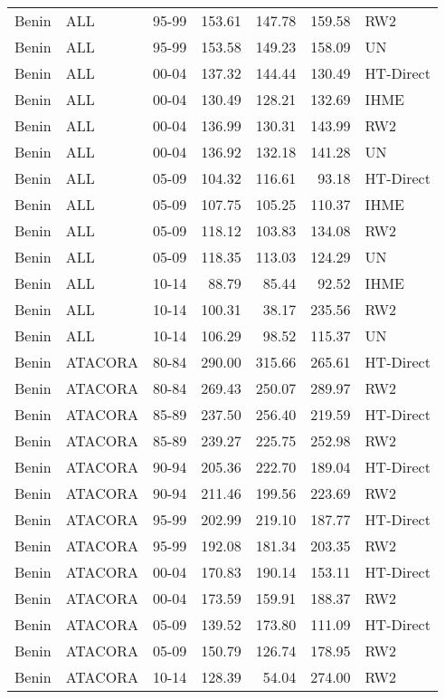 \begin{longtable}{lllrrrl}
  Benin & ALL & 95-99 & 153.61 & 147.78 & 159.58 & RW2 \\ 
  Benin & ALL & 95-99 & 153.58 & 149.23 & 158.09 & UN \\ 
  Benin & ALL & 00-04 & 137.32 & 144.44 & 130.49 & HT-Direct \\ 
  Benin & ALL & 00-04 & 130.49 & 128.21 & 132.69 & IHME \\ 
  Benin & ALL & 00-04 & 136.99 & 130.31 & 143.99 & RW2 \\ 
  Benin & ALL & 00-04 & 136.92 & 132.18 & 141.28 & UN \\ 
  Benin & ALL & 05-09 & 104.32 & 116.61 & 93.18 & HT-Direct \\ 
  Benin & ALL & 05-09 & 107.75 & 105.25 & 110.37 & IHME \\ 
  Benin & ALL & 05-09 & 118.12 & 103.83 & 134.08 & RW2 \\ 
  Benin & ALL & 05-09 & 118.35 & 113.03 & 124.29 & UN \\ 
  Benin & ALL & 10-14 & 88.79 & 85.44 & 92.52 & IHME \\ 
  Benin & ALL & 10-14 & 100.31 & 38.17 & 235.56 & RW2 \\ 
  Benin & ALL & 10-14 & 106.29 & 98.52 & 115.37 & UN \\ 
  Benin & ATACORA & 80-84 & 290.00 & 315.66 & 265.61 & HT-Direct \\ 
  Benin & ATACORA & 80-84 & 269.43 & 250.07 & 289.97 & RW2 \\ 
  Benin & ATACORA & 85-89 & 237.50 & 256.40 & 219.59 & HT-Direct \\ 
  Benin & ATACORA & 85-89 & 239.27 & 225.75 & 252.98 & RW2 \\ 
  Benin & ATACORA & 90-94 & 205.36 & 222.70 & 189.04 & HT-Direct \\ 
  Benin & ATACORA & 90-94 & 211.46 & 199.56 & 223.69 & RW2 \\ 
  Benin & ATACORA & 95-99 & 202.99 & 219.10 & 187.77 & HT-Direct \\ 
  Benin & ATACORA & 95-99 & 192.08 & 181.34 & 203.35 & RW2 \\ 
  Benin & ATACORA & 00-04 & 170.83 & 190.14 & 153.11 & HT-Direct \\ 
  Benin & ATACORA & 00-04 & 173.59 & 159.91 & 188.37 & RW2 \\ 
  Benin & ATACORA & 05-09 & 139.52 & 173.80 & 111.09 & HT-Direct \\ 
  Benin & ATACORA & 05-09 & 150.79 & 126.74 & 178.95 & RW2 \\ 
  Benin & ATACORA & 10-14 & 128.39 & 54.04 & 274.00 & RW2 \\ 

\end{longtable}
